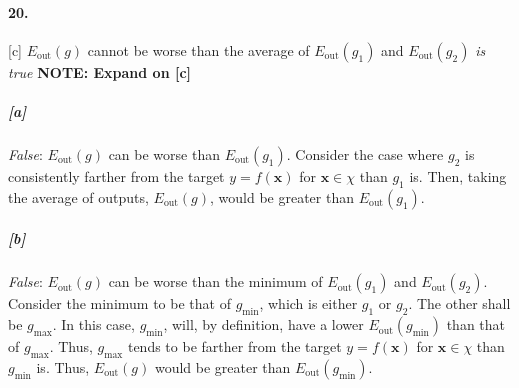 \documentclass[titlepage]{article}
\begin{document}
\paragraph{20.} [c] $E_{\text{out}}(g)$ cannot be worse than the average of $E_{\text{out}}(g_1)$ and $E_{\text{out}}(g_2)$ \textit{is true} \textbf{NOTE: Expand on [c]}

	\subparagraph{[a]} \textit{False}: $E_{\text{out}}(g)$ can be worse than $E_{\text{out}}(g_1)$. Consider the case where $g_2$ is consistently farther from the target $y = f(\bm x)$ for $\bm x \in \chi$ than $g_1$ is. Then, taking the average of outputs, $E_{\text{out}}(g)$, would be greater than $E_{\text{out}}(g_1)$.

	\subparagraph{[b]} \textit{False}: $E_{\text{out}}(g)$ can be worse than the minimum of $E_{\text{out}}(g_1)$ and $E_{\text{out}}(g_2)$. Consider the minimum to be that of $g_{\text{min}}$, which is either $g_1$ or $g_2$. The other shall be $g_{\text{max}}$. In this case, $g_{\text{min}}$, will, by definition, have a lower $E_{\text{out}}(g_{\text{min}})$ than that of $g_{\text{max}}$. Thus, $g_{\text{max}}$ tends to be farther from the target $y = f(\bm x)$ for $\bm x \in \chi$ than $g_{\text{min}}$ is. Thus, $E_{\text{out}}(g)$ would be greater than $E_{\text{out}}(g_{\text{min}})$.
	
\end{document}
